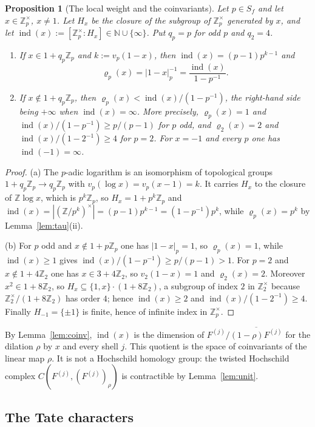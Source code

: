 \documentclass[11pt]{amsart}
\newtheorem{proposition}[theorem]{Proposition}
\theoremstyle{definition}
\theoremstyle{remark}
\newcommand{\N}{\mathbb N}
\newcommand{\Z}{\mathbb Z}
\newcommand{\ind}{\operatorname{ind}}
\begin{document}
\begin{proposition}[The local weight and the coinvariants]\label{prop:haarrank}
Let $p\in S_f$ and let $x\in\Z_p^{\times}$, $x\ne1$.  Let $H_x$ be the closure
of the subgroup of $\Z_p^{\times}$ generated by $x$, and let
$\ind(x):=[\Z_p^{\times}:H_x]\in\N\cup\{\infty\}$.  Put $q_p=p$ for odd $p$
and $q_2=4$.
\begin{enumerate}
\item[(a)] If $x\in1+q_p\Z_p$ and $k:=v_p(1-x)$, then $\ind(x)=(p-1)p^{k-1}$ and
\[
\varrho_p(x)=|1-x|_p^{-1}=\frac{\ind(x)}{1-p^{-1}} .
\]
\item[(b)] If $x\notin1+q_p\Z_p$, then
$\varrho_p(x)<\ind(x)/(1-p^{-1})$, the right-hand side being $+\infty$ when
$\ind(x)=\infty$.  More precisely, $\varrho_p(x)=1$ and
$\ind(x)/(1-p^{-1})\ge p/(p-1)$ for $p$ odd, and $\varrho_2(x)=2$ and
$\ind(x)/(1-2^{-1})\ge4$ for $p=2$.  For $x=-1$ and every $p$ one has
$\ind(-1)=\infty$.
\end{enumerate}
\end{proposition}

\begin{proof}
(a)  The $p$-adic logarithm is an isomorphism of topological groups
$1+q_p\Z_p\to q_p\Z_p$ with $v_p(\log x)=v_p(x-1)=k$.  It carries $H_x$ to the
closure of $\Z\log x$, which is $p^{k}\Z_p$, so $H_x=1+p^{k}\Z_p$ and
$\ind(x)=|(\Z/p^{k})^{\times}|=(p-1)p^{k-1}=(1-p^{-1})p^{k}$, while
$\varrho_p(x)=p^{k}$ by Lemma~\ref{lem:tau}(ii).

(b)  For $p$ odd and $x\notin1+p\Z_p$ one has $|1-x|_p=1$, so
$\varrho_p(x)=1$, while $\ind(x)\ge1$ gives
$\ind(x)/(1-p^{-1})\ge p/(p-1)>1$.  For $p=2$ and $x\notin1+4\Z_2$ one has
$x\in3+4\Z_2$, so $v_2(1-x)=1$ and $\varrho_2(x)=2$.  Moreover
$x^{2}\in1+8\Z_2$, so $H_x\subseteq\{1,x\}\cdot(1+8\Z_2)$, a subgroup of index
$2$ in $\Z_2^{\times}$ because $\Z_2^{\times}/(1+8\Z_2)$ has order $4$; hence
$\ind(x)\ge2$ and $\ind(x)/(1-2^{-1})\ge4$.  Finally $H_{-1}=\{\pm1\}$ is
finite, hence of infinite index in $\Z_p^{\times}$.
\end{proof}

By Lemma~\ref{lem:coinv}, $\ind(x)$ is the dimension of
$F^{(j)}/\overline{(1-\rho)F^{(j)}}$ for the dilation $\rho$ by $x$ and every
shell $j$.  This quotient is the space of coinvariants of the linear map
$\rho$.  It is not a Hochschild homology group: the twisted Hochschild complex
$C(F^{(j)},(F^{(j)})_{\rho})$ is contractible by Lemma~\ref{lem:unit}.

\subsection{The Tate characters}\label{sec:symbol}
\end{document}
